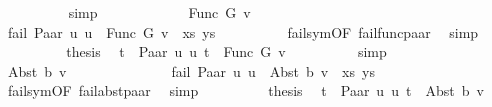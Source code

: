 \begin{isabellebody}
\ \ \ \ \ \ \ \ \isamarkupfalse%
\ simp\isanewline
\ \ \ \ \isamarkupfalse%
\isanewline
\ \ \ \ \ \ \isamarkupfalse%
\ {\isacharparenleft}{\kern0pt}Func\ G\ v{\isacharparenright}{\kern0pt}\isanewline
\ \ \ \ \ \ %
\isanewline
\ \ \ \ \ \ \isamarkupfalse%
\ {\isachardoublequoteopen}fail\ {\isacharparenleft}{\kern0pt}{\isacharparenleft}{\kern0pt}Paar\ u{}\ u{}\ {\isasymapprox}{\isacharquery}{\kern0pt}\ Func\ G\ v{\isacharparenright}{\kern0pt}\ {\isacharhash}{\kern0pt}\ xs{\isacharcomma}{\kern0pt}\ ys{\isacharparenright}{\kern0pt}{\isachardoublequoteclose}\isanewline
\ \ \ \ \ \ \ \ \isamarkupfalse%
\ fail{\isacharunderscore}{\kern0pt}sym{\isacharbrackleft}{\kern0pt}OF\ fail{\isacharunderscore}{\kern0pt}func{\isacharunderscore}{\kern0pt}paar{\isacharbrackright}{\kern0pt}\ \isamarkupfalse%
\ simp\isanewline
\ \ \ \ \ \ \isamarkupfalse%
\ \isamarkupfalse%
\ {\isacharquery}{\kern0pt}thesis\ \isamarkupfalse%
\ {\isacartoucheopen}t{}\ {\isacharequal}{\kern0pt}\ Paar\ u{}\ u{}{\isacartoucheclose}\ {\isacartoucheopen}t{}\ {\isacharequal}{\kern0pt}\ Func\ G\ v{\isacartoucheclose}\isanewline
\ \ \ \ \ \ \ \ \isamarkupfalse%
\ simp\isanewline
\ \ \ \ \isamarkupfalse%
\isanewline
\ \ \ \ \ \ \isamarkupfalse%
\ {\isacharparenleft}{\kern0pt}Abst\ b\ v{\isacharparenright}{\kern0pt}\isanewline
\ \ \ \ \ \ %
\isanewline
\ \ \ \ \ \ \isamarkupfalse%
\ {\isachardoublequoteopen}fail\ {\isacharparenleft}{\kern0pt}{\isacharparenleft}{\kern0pt}Paar\ u{}\ u{}\ {\isasymapprox}{\isacharquery}{\kern0pt}\ Abst\ b\ v{\isacharparenright}{\kern0pt}\ {\isacharhash}{\kern0pt}\ xs{\isacharcomma}{\kern0pt}\ ys{\isacharparenright}{\kern0pt}{\isachardoublequoteclose}\isanewline
\ \ \ \ \ \ \ \ \isamarkupfalse%
\ fail{\isacharunderscore}{\kern0pt}sym{\isacharbrackleft}{\kern0pt}OF\ fail{\isacharunderscore}{\kern0pt}abst{\isacharunderscore}{\kern0pt}paar{\isacharbrackright}{\kern0pt}\ \isamarkupfalse%
\ simp\isanewline
\ \ \ \ \ \ \isamarkupfalse%
\ \isamarkupfalse%
\ {\isacharquery}{\kern0pt}thesis\ \isamarkupfalse%
\ {\isacartoucheopen}t{}\ {\isacharequal}{\kern0pt}\ Paar\ u{}\ u{}{\isacartoucheclose}\ {\isacartoucheopen}t{}\ {\isacharequal}{\kern0pt}\ Abst\ b\ v{\isacartoucheclose}\isanewline

\end{isabellebody}
